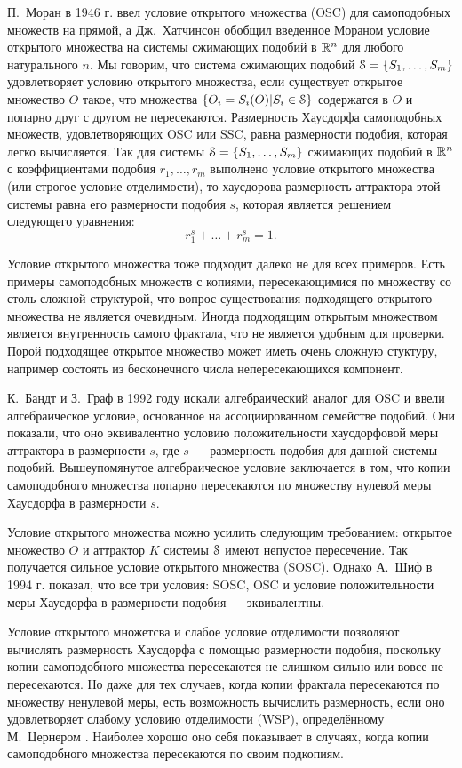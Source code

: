П.~Моран в 1946 г. \cite{Moran1946} ввел условие открытого множества (OSC) для самоподобных множеств на прямой, а Дж.~Хатчинсон \cite{Hut1981} обобщил введенное Мораном условие открытого множества на системы сжимающих подобий в $\mathbb{R}^n$ для любого натурального $n$.
Мы говорим, что система сжимающих подобий ${\EuScript S}=\{S_1, \ldots, S_m\}$ удовлетворяет условию открытого множества, если существует открытое множество $O$ такое, что множества $\{O_i=S_i(O) | S_i\in{\EuScript S}\}$ содержатся в $O$ и попарно друг с другом не пересекаются.
Размерность Хаусдорфа самоподобных множеств, удовлетворяющих OSC или SSC, равна размерности подобия, которая легко вычисляется.
Так для системы ${\EuScript S}=\{S_1,\ldots,S_m\}$ сжимающих подобий в $\mathbb{R}^n$ с коэффициентами подобия $r_1, \ldots, r_m$ выполнено условие открытого множества (или строгое условие отделимости), то хаусдорова размерность  аттрактора этой системы равна его размерности подобия $s$, которая является решением следующего уравнения: $$r_1^s+\ldots+r_m^s=1.$$ 

Условие открытого множества тоже подходит далеко не для всех примеров.
Есть примеры самоподобных множеств с копиями, пересекающимися по множеству со столь сложной структурой, что вопрос существования подходящего открытого множества не является очевидным.
Иногда подходящим открытым множеством является внутренность самого фрактала, что не является удобным для проверки. 
Порой подходящее открытое множество может иметь очень сложную стуктуру, например состоять из бесконечного числа непересекающихся компонент.

К.~Бандт и З.~Граф в 1992 году \cite{SSS7} искали алгебраический аналог для OSC и ввели алгебраическое условие, основанное на ассоциированном семействе подобий. 
Они показали, что оно эквивалентно условию положительности хаусдорфовой меры аттрактора в размерности $s$, где $s$ --- размерность подобия для данной системы подобий.
Вышеупомянутое алгебраическое условие заключается в том, что копии самоподобного множества попарно пересекаются по множеству нулевой меры Хаусдорфа в размерности $s$.

Условие открытого множества можно усилить следующим требованием: открытое множество $O$ и аттрактор $K$ системы ${\EuScript S}$ имеют непустое пересечение. 
Так получается сильное условие открытого множества (SOSC).
Однако А.~Шиф \cite{Schief1994} в 1994 г. показал, что все три условия: SOSC, OSC и условие положительности меры Хаусдорфа в размерности подобия --- эквивалентны.

Условие открытого множетсва и слабое условие отделимости позволяют вычислять размерность Хаусдорфа с помощью размерности подобия, поскольку копии самоподобного множества пересекаются не слишком сильно или вовсе не пересекаются.
Но даже для тех случаев, когда копии фрактала пересекаются по множеству ненулевой меры, есть возможность вычислить размерность, если оно удовлетворяет  слабому условию отделимости (WSP), определённому М.~Цернером \cite{Zerner1996}.
Наиболее хорошо оно себя показывает в случаях, когда копии самоподобного множества пересекаются по своим подкопиям.

